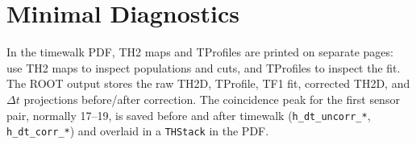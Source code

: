 \documentclass[10pt]{article}
\begin{document}
\section*{Minimal Diagnostics}
In the timewalk PDF, TH2 maps and TProfiles are printed on separate pages: use TH2 maps to inspect populations and cuts, and TProfiles to inspect the fit. The ROOT output stores the raw TH2D, TProfile, TF1 fit, corrected TH2D, and \(\Delta t\) projections before/after correction. The coincidence peak for the first sensor pair, normally 17--19, is saved before and after timewalk (\texttt{h\_dt\_uncorr\_*}, \texttt{h\_dt\_corr\_*}) and overlaid in a \texttt{THStack} in the PDF.
\end{document}
